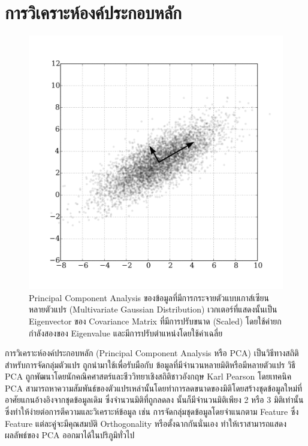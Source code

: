\section{การวิเคราะห์องค์ประกอบหลัก}
\label{sec:pca}

\begin{figure}[H]
    \centering
    \includegraphics[width=0.8\linewidth]{fig/pca.png}
    \caption{Principal Component Analysis ของข้อมูลที่มีการกระจายตัวแบบเกาส์เซียนหลายตัวแปร (Multivariate Gaussian
    Distribution) เวกเตอร์ที่แสดงนั้นเป็น Eigenvector ของ Covariance Matrix ที่มีการปรับขนาด (Scaled) โดยใช้ค่ายกกำลังสองของ 
    Eigenvalue และมีการปรับตำแหน่งโดยใช้ค่าเฉลี่ย}
    \label{fig:pca}
\end{figure}

การวิเคราะห์องค์ประกอบหลัก (Principal Component Analysis หรือ PCA) เป็นวิธีทางสถิติสำหรับการจัดกลุ่มตัวแปร ถูกนำมาใช้เพื่อรับมือกับ%
ข้อมูลที่มีจำนวนหลายมิติหรือมีหลายตัวแปร วิธี PCA ถูกพัฒนาโดยนักคณิคศาสตร์และชีววิทยาเชิงสถิติชาวอังกฤษ Karl Pearson โดยเทคนิค PCA 
สามารถหาความสัมพันธ์ของตัวแปรเหล่านั้นโดยทำการลดขนาดของมิติโดยสร้างชุดข้อมูลใหม่ที่อาศัยแกนอ้างอิงจากชุดข้อมูลเดิม ซึ่งจำนวนมิติที่ถูกลดลง%
นั้นก็มีจำนวนมิติเพียง 2 หรือ 3 มิติเท่านั้น ซึ่งทำให้ง่ายต่อการตีความและวิเคราะห์ข้อมูล เช่น การจัดกลุ่มชุดข้อมูลโดยจำแนกตาม Feature 
ซึ่ง Feature แต่ละคู่จะมีคุณสมบัติ Orthogonality หรือตั้งฉากกันนั่นเอง ทำให้เราสามารถแสดงผลลัพธ์ของ PCA ออกมาได้ในปริภูมิทั่วไป

